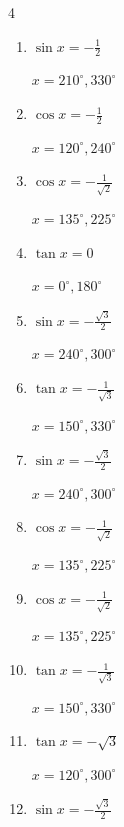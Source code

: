 \begin{multicols}{4}
\begin{enumerate}
        $\displaystyle x = 90^{\circ}$

  \item $\displaystyle \sin{x}  = -\frac{1}{2}$

        $\displaystyle x = 210^{\circ} , 330^{\circ}$

  \item $\displaystyle \cos{x}  = -\frac{1}{2}$

        $\displaystyle x = 120^{\circ} , 240^{\circ}$

  \item $\displaystyle \cos{x}  = -\frac{1}{\sqrt{2}}$

        $\displaystyle x = 135^{\circ} , 225^{\circ}$

  \item $\displaystyle \tan{x}  = 0$

        $\displaystyle x = 0^{\circ} , 180^{\circ}$

  \item $\displaystyle \sin{x}  = -\frac{\sqrt{3}}{2}$

        $\displaystyle x = 240^{\circ} , 300^{\circ}$

  \item $\displaystyle \tan{x}  = -\frac{1}{\sqrt{3}}$

        $\displaystyle x = 150^{\circ} , 330^{\circ}$

  \item $\displaystyle \sin{x}  = -\frac{\sqrt{3}}{2}$

        $\displaystyle x = 240^{\circ} , 300^{\circ}$

  \item $\displaystyle \cos{x}  = -\frac{1}{\sqrt{2}}$

        $\displaystyle x = 135^{\circ} , 225^{\circ}$

  \item $\displaystyle \cos{x}  = -\frac{1}{\sqrt{2}}$

        $\displaystyle x = 135^{\circ} , 225^{\circ}$

  \item $\displaystyle \tan{x}  = -\frac{1}{\sqrt{3}}$

        $\displaystyle x = 150^{\circ} , 330^{\circ}$

  \item $\displaystyle \tan{x}  = -\sqrt{3}$

        $\displaystyle x = 120^{\circ} , 300^{\circ}$

  \item $\displaystyle \sin{x}  = -\frac{\sqrt{3}}{2}$


\end{enumerate}
\end{multicols}
